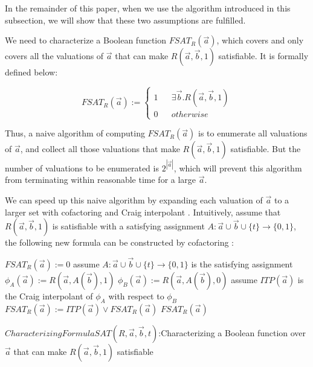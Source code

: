 \documentclass[runningheads,a4paper,orivec]{llncs}
\begin{document}
In the remainder of this paper, 
when we use the algorithm introduced in this subsection,
we will show that these two assumptions are fulfilled.

We need to characterize a Boolean function $FSAT_R(\vec{a})$,
which covers and only covers all the valuations of $\vec{a}$ 
that can make $R(\vec{a},\vec{b},1)$ satisfiable.
It is formally defined below:

\begin{equation}\label{fchar}
FSAT_R(\vec{a}):=
\left\{
\begin{array}{rcl}
1 & & \exists\vec{b}.R(\vec{a},\vec{b},1) \\
0 & & otherwise
\end{array}
\right.
\end{equation}

Thus,
a naive algorithm of computing $FSAT_R(\vec{a})$ is to enumerate all valuations of $\vec{a}$,
and collect all those valuations that make $R(\vec{a},\vec{b},1)$ satisfiable.
But the number of valuations to be enumerated is $2^{|\vec{a}|}$,
which will prevent this algorithm from terminating within reasonable time for a large $\vec{a}$.

We can speed up this naive algorithm by expanding each valuation of $\vec{a}$ 
to a larger set with cofactoring \cite{EFFSATUSMCCO} and Craig interpolant \cite{interp_McMillan}.
Intuitively,
assume that $R(\vec{a},\vec{b},1)$ is satisfiable with a satisfying assignment $A:\vec{a}\cup\vec{b}\cup\{t\}\to\{0,1\}$,
the following new formula can be constructed by cofactoring \cite{EFFSATUSMCCO}:

\begin{algorithm}[b]
\SetAlgoVlined
{}
$FSAT_R(\vec{a}):= 0$ \;
 {
  assume $A:\vec{a}\cup\vec{b}\cup\{t\}\rightarrow \{0,1\}$ is the satisfying assignment \;
  $\phi_A(\vec{a}):= R(\vec{a},A(\vec{b}),1)$ \;
  $\phi_B(\vec{a}):= R(\vec{a},A(\vec{b}),0)$ \;
  assume $ITP(\vec{a})$ is the Craig interpolant of $\phi_A$ with respect to $\phi_B$ \;
  $FSAT_R(\vec{a}):= ITP(\vec{a}) \vee FSAT_R(\vec{a})$ \;
}
\KwRet $FSAT_R(\vec{a})$
\caption{$CharacterizingFormulaSAT(R,\vec{a},\vec{b},t)$:Characterizing a Boolean function over $\vec{a}$ that can make $R(\vec{a},\vec{b},1)$ satisfiable}
\label{alg_craigchar}
\end{algorithm}
\end{document}
